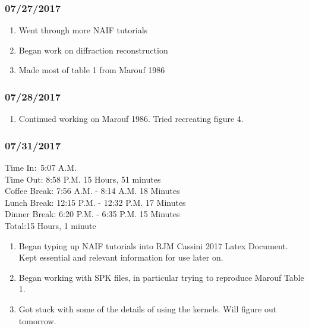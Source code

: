 \documentclass[crop=false,class=book]{standalone}
\begin{document}
\subsubsection{\footnotesize 07/27/2017}
\begin{enumerate}
    \item Went through more NAIF tutorials
    \item Began work on diffraction reconstruction
    \item Made most of table 1 from Marouf 1986
\end{enumerate}
\subsubsection{\footnotesize 07/28/2017}
\begin{enumerate}
    \item Continued working on Marouf 1986. Tried recreating figure 4.
\end{enumerate}
\subsubsection{\footnotesize 07/31/2017}
Time In:\ 5:07 A.M.\\
Time Out: 8:58 P.M. \hfill 15 Hours, 51 minutes\\
Coffee Break: 7:56 A.M. - 8:14 A.M. \hfill 18 Minutes\\
Lunch Break: 12:15 P.M. - 12:32 P.M. \hfill 17 Minutes\\
Dinner Break: 6:20 P.M. - 6:35 P.M. \hfill 15 Minutes\\
Total:\hfill 15 Hours, 1 minute
\begin{enumerate}
    \item Began typing up NAIF tutorials into RJM Cassini 2017 Latex Document. Kept essential and relevant information for use later on.
    \item Began working with SPK files, in particular trying to reproduce Marouf Table 1.
    \item Got stuck with some of the details of using the kernels. Will figure out tomorrow.
\end{enumerate}
\end{document}
